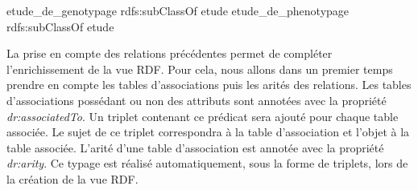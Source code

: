 \begin{verbatimtab}
etude_de_genotypage 	rdfs:subClassOf 	etude
etude_de_phenotypage	rdfs:subClassOf 	etude
\end{verbatimtab}


 La prise en compte des relations précédentes permet de compléter l'enrichissement de la vue RDF. %
Pour cela, nous allons dans un premier temps 
 prendre en compte les tables d'associations puis les arités des relations. 
 Les tables d'associations possédant ou non des attributs sont annotées avec la propriété \textit{dr:associatedTo}. Un triplet contenant ce prédicat sera ajouté pour chaque table associée. Le sujet de ce triplet correspondra à la table d'association et l'objet à la table associée. L’arité d’une table d’association est annotée avec la propriété \textit{dr:arity}. Ce typage est réalisé automatiquement, sous la forme de triplets, lors de la création de la vue RDF.
 




